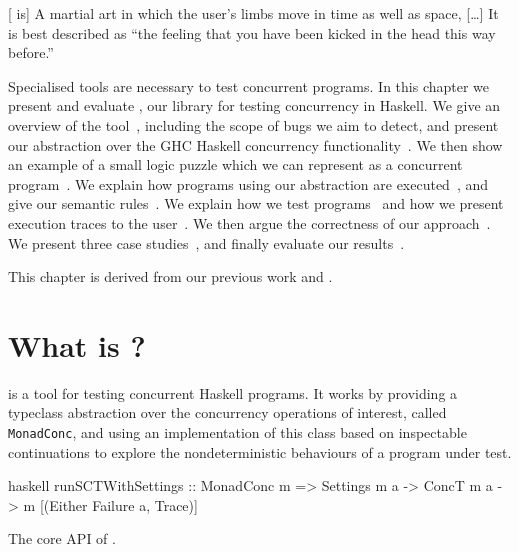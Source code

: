 \begin{displayquote}
  {[}\dejafu{} is] A martial art in which the user's limbs move in
  time as well as space, [\ldots] It is best described as ``the
  feeling that you have been kicked in the head this way
  before.'' \parencite{pratchett2001}
\end{displayquote}

\noindent
Specialised tools are necessary to test concurrent programs.  In this
chapter we present and evaluate \dejafu{}, our library for testing
concurrency in Haskell.  We give an overview of the
tool~, including the scope of bugs we aim to
detect, and present our abstraction over the GHC Haskell concurrency
functionality~.  We then show an example of a
small logic puzzle which we can represent as a concurrent
program~.  We explain how programs using our
abstraction are executed~, and give our
semantic rules~.  We explain how we test
programs~ and how we present execution traces to
the user~.  We then argue the correctness of our
approach~.  We present three case
studies~, and finally evaluate our
results~.

This chapter is derived from our previous work \cite{walker2015} and
\cite{YCS-2016-503}.

\section{What is \dejafu{}?}
\label{sec:dejafu-whatis}

\dejafu{} is a tool for testing concurrent Haskell programs.  It works
by providing a typeclass abstraction over the concurrency operations
of interest, called \verb|MonadConc|, and using an implementation of
this class based on inspectable continuations to explore the
nondeterministic behaviours of a program under test.

\begin{listing}
\centering
\begin{cminted}{haskell}
runSCTWithSettings :: MonadConc m
  => Settings m a
  -> ConcT m a
  -> m [(Either Failure a, Trace)]
\end{cminted}
\caption{The core API of \dejafu{}.}\label{lst:dejafucore}
\end{listing}

